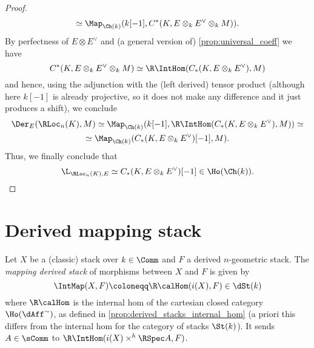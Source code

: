 \begin{proof}
\begin{gather*}
                    \simeq \Map_{\Ch(k)}(k[-1], C^*(K, E \otimes_k E^{\vee} \otimes_k M)). 
                \end{gather*}
                By perfectness of $E \otimes E^{\vee}$ and (a general version of) \cref{prop:universal_coeff} we have \[C^*(K, E \otimes_k E^{\vee} \otimes_k M) \simeq \R\IntHom(C_*(K, E \otimes_k E^{\vee}), M)\] and hence, using the adjunction with the (left derived) tensor product (although here $k[-1]$ is already projective, so it does not make any difference and it just produces a shift), we conclude 
                \begin{gather*}
                    \Der_E(\RLoc_n(K), M) \simeq \Map_{\Ch(k)}(k[-1], \R\IntHom(C_*(K, E \otimes_k E^{\vee}), M)) \simeq \\
                    \simeq \Map_{\Ch(k)}(C_*(K, E \otimes_k E^{\vee})[-1], M). 
                \end{gather*}
                Thus, we finally conclude that \[\L_{\RLoc_n(K), E} \simeq C_*(K, E \otimes_k E^{\vee})[-1] \in \Ho(\Ch(k)). \qedhere\]
            \end{proof}
    \section{Derived mapping stack}
        \begin{defn}
            Let $X$ be a (classic) stack over $k \in \Comm$ and $F$ a derived $n$-geometric stack. The \emph{mapping derived stack} of morphisms between $X$ and $F$ is given by \[ \IntMap(X, F) \coloneqq \R\calHom(i(X), F) \in \dSt(k)\] where $\R\calHom$ is the internal hom of the cartesian closed category $\Ho(\dAff^{\sim})$, as defined in \cref{prop:derived_stacks_internal_hom} (a priori this differs from the internal hom for the category of stacks $\St(k)$). It sends $A \in \sComm$ to $\R\IntHom(i(X) \times^h \RSpec A, F)$.
        \end{defn}
        
